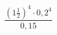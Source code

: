 \begin{ex}[type=calculate]
	\begin{condition}
		\( \dfrac{\left( 1\frac{1}{2} \right)^4\cdot0,2^4}{0,15} \)
	\end{condition}
\end{ex}